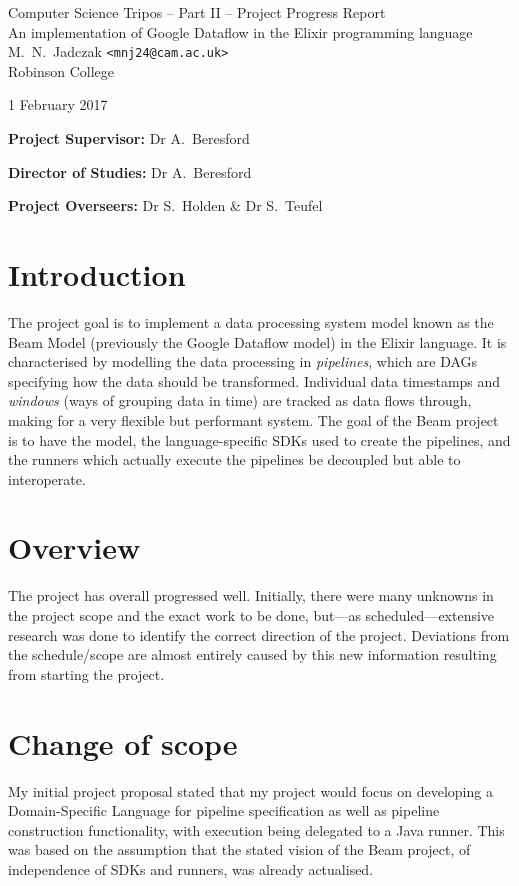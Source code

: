 \documentclass[11pt]{scrartcl}
\begin{document}
\begin{center}
\Large
Computer Science Tripos -- Part II -- Project Progress Report\\[4mm]
\LARGE
An implementation of Google Dataflow in the Elixir programming language\\[4mm]

\large
M.~N.~Jadczak \texttt{<mnj24@cam.ac.uk>}\\Robinson College

1 February 2017
\end{center}

\vspace{5mm}

\textbf{Project Supervisor:} Dr A.~Beresford

\textbf{Director of Studies:} Dr A.~Beresford

\textbf{Project Overseers:} Dr S.~Holden  \& Dr S.~Teufel


\section*{Introduction}
The project goal is to implement a data processing system model known as the Beam Model (previously the Google Dataflow model) in the Elixir language. It is characterised by modelling the data processing in \emph{pipelines}, which are DAGs specifying how the data should be transformed. Individual data timestamps and \emph{windows} (ways of grouping data in time) are tracked as data flows through, making for a very flexible but performant system. The goal of the Beam project is to have the model, the language-specific SDKs used to create the pipelines, and the runners which actually execute the pipelines be decoupled but able to interoperate.

\section*{Overview}
The project has overall progressed well. Initially, there were many unknowns in the project scope and the exact work to be done, but---as scheduled---extensive research was done to identify the correct direction of the project. Deviations from the schedule/scope are almost entirely caused by this new information resulting from starting the project.

\section*{Change of scope}
My initial project proposal stated that my project would focus on developing a Domain-Specific Language for pipeline specification as well as pipeline construction functionality, with execution being delegated to a Java runner. This was based on the assumption that the stated vision of the Beam project, of independence of SDKs and runners, was already actualised.
\end{document}
